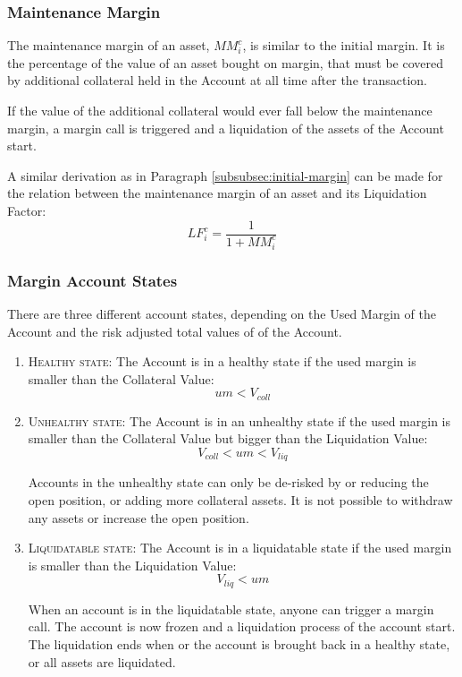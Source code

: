 \documentclass[sigconf,nonacm]{acmart}
\begin{document}
\subsubsection{Maintenance Margin}
The maintenance margin of an asset, $MM_{i}^{c}$, is similar to the initial margin.
It is the percentage of the value of an asset bought on margin, that must be covered by additional collateral held in the Account at all time after the transaction.

If the value of the additional collateral would ever fall below the maintenance margin, a margin call is triggered and a liquidation of the assets of the Account start.

A similar derivation as in Paragraph \ref{subsubsec:initial-margin} can be made for the relation between the maintenance margin of an asset and its Liquidation Factor:
\begin{equation}
    LF_{i}^{c} = \frac{1}{1 + MM_{i}^{c}}
\end{equation}

\subsubsection{Margin Account States}
There are three different account states, depending on the Used Margin of the Account and the risk adjusted total values of of the Account.

\begin{enumerate}
    \item \textsc{Healthy state:} The Account is in a healthy state if the used margin is smaller than the Collateral Value:
        \begin{equation}
            um < V_{coll}
        \end{equation}
    \item \textsc{Unhealthy state:} The Account is in an unhealthy state if the used margin is smaller than the Collateral Value but bigger than the Liquidation Value:
        \begin{equation}
            V_{coll} < um < V_{liq}
        \end{equation}
        
        Accounts in the unhealthy state can only be de-risked by or reducing the open position, or adding more collateral assets.
        It is not possible to withdraw any assets or increase the open position.
    \item \textsc{Liquidatable state:} The Account is in a liquidatable state if the used margin is smaller than the Liquidation Value:
        \begin{equation}
            V_{liq} < um
        \end{equation}
        
        When an account is in the liquidatable state, anyone can trigger a margin call.
        The account is now frozen and a liquidation process of the account start.
        The liquidation ends when or the account is brought back in a healthy state, or all assets are liquidated.
\end{enumerate}
\end{document}

